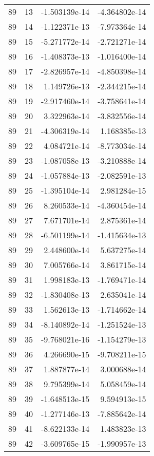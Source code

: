 \begin{tabular}{rrrr}
  89 &   13 & -1.503139e-14 & -4.364802e-14 \\
  89 &   14 & -1.122371e-13 & -7.973364e-14 \\
  89 &   15 & -5.271772e-14 & -2.721271e-14 \\
  89 &   16 & -1.408373e-13 & -1.016400e-14 \\
  89 &   17 & -2.826957e-14 & -4.850398e-14 \\
  89 &   18 &  1.149726e-13 & -2.344215e-14 \\
  89 &   19 & -2.917460e-14 & -3.758641e-14 \\
  89 &   20 &  3.322963e-14 & -3.832556e-14 \\
  89 &   21 & -4.306319e-14 &  1.168385e-13 \\
  89 &   22 &  4.084721e-14 & -8.773034e-14 \\
  89 &   23 & -1.087058e-13 & -3.210888e-14 \\
  89 &   24 & -1.057884e-13 & -2.082591e-13 \\
  89 &   25 & -1.395104e-14 &  2.981284e-15 \\
  89 &   26 &  8.260533e-14 & -4.360454e-14 \\
  89 &   27 &  7.671701e-14 &  2.875361e-14 \\
  89 &   28 & -6.501199e-14 & -1.415634e-13 \\
  89 &   29 &  2.448600e-14 &  5.637275e-14 \\
  89 &   30 &  7.005766e-14 &  3.861715e-14 \\
  89 &   31 &  1.998183e-13 & -1.769471e-14 \\
  89 &   32 & -1.830408e-13 &  2.635041e-14 \\
  89 &   33 &  1.562613e-13 & -1.714662e-14 \\
  89 &   34 & -8.140892e-14 & -1.251524e-13 \\
  89 &   35 & -9.768021e-16 & -1.154279e-13 \\
  89 &   36 &  4.266690e-15 & -9.708211e-15 \\
  89 &   37 &  1.887877e-14 &  3.000688e-14 \\
  89 &   38 &  9.795399e-14 &  5.058459e-14 \\
  89 &   39 & -1.648513e-15 &  9.594913e-15 \\
  89 &   40 & -1.277146e-13 & -7.885642e-14 \\
  89 &   41 & -8.622133e-14 &  1.483823e-13 \\
  89 &   42 & -3.609765e-15 & -1.990957e-13 \\

\end{tabular}
